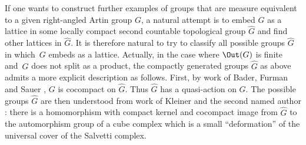 \begin{rk}
If one wants to construct further examples of groups that are measure equivalent to a given right-angled Artin group $G$, a natural attempt is to embed $G$ as a lattice in some locally compact second countable topological group $\hat{G}$ and find other lattices in $\hat{G}$. It is therefore natural to try to classify all possible groups $\hat{G}$ in which~$G$ embeds as a lattice. Actually, in the case where $\Out(G)$ is finite and~$G$ does not split as a product, the compactly generated groups $\hat G$ as above admits a more explicit description as follows. First, by work of Bader, Furman and Sauer \hbox{\cite[Th.\,1.4 \& Th.\,A]{bader2020lattice}}, $G$ is cocompact on $\hat G$. Thus $\hat G$ has a quasi-action on $G$. The possible groups $\hat{G}$ are then understood from work of Kleiner and the second named author \cite{KH}: there is a homomorphism with compact kernel and cocompact image from $\hat{G}$ to the automorphism group of a cube complex which is a small ``deformation'' of the universal cover of the Salvetti complex.
\end{rk}
